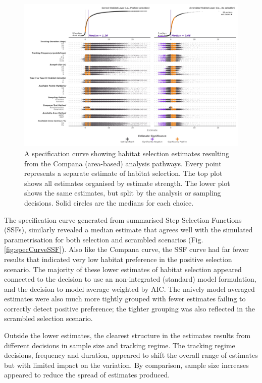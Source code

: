 \documentclass[10pt,a4paper]{article}
\begin{document}
\begin{figure}
\includegraphics[width=1\linewidth]{../figures/area_specCurve} \caption{A specification curve showing habitat selection estimates resulting from the Compana (area-based) analysis pathways. Every point represents a separate estimate of habitat selection. The top plot shows all estimates organised by estimate strength. The lower plot shows the same estimates, but split by the analysis or sampling decisions. Solid circles are the medians for each choice.}\label{fig:specCurveArea}
\end{figure}

The specification curve generated from summarised Step Selection Functions (SSFs), similarly revealed a median estimate that agrees well with the simulated parametrisation for both selection and scrambled scenarios (Fig. \ref{fig:specCurveSSF}).
Also like the Compana curve, the SSF curve had far fewer results that indicated very low habitat preference in the positive selection scenario.
The majority of these lower estimates of habitat selection appeared connected to the decision to use an non-integrated (standard) model formulation, and the decision to model average weighted by AIC.
The naively model averaged estimates were also much more tightly grouped with fewer estimates failing to correctly detect positive preference; the tighter grouping was also reflected in the scrambled selection scenario.

Outside the lower estimates, the clearest structure in the estimates results from different decisions in sample size and tracking regime.
The tracking regime decisions, frequency and duration, appeared to shift the overall range of estimates but with limited impact on the variation.
By comparison, sample size increases appeared to reduce the spread of estimates produced.
\end{document}

